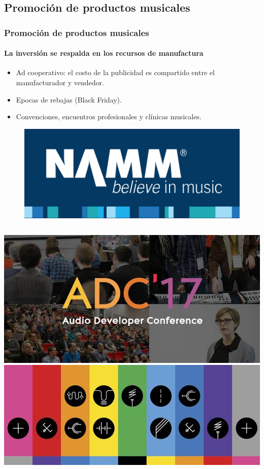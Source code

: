 \documentclass[xcolor=table]{beamer}
\begin{document}
	\subsection{Promoción de productos musicales}
	\begin{frame}
		\frametitle{Promoción de productos musicales}
		\framesubtitle{La inversión se respalda en los recursos de manufactura}
		\begin{itemize}
			\item Ad cooperativo: el costo de la publicidad es compartido entre el manufacturador y vendedor.
			\item Epocas de rebajas (Black Friday).
			\item Convenciones, encuentros profesionales y clínicas musicales.
		\end{itemize}
		\begin{figure}[h]
    			\includegraphics[scale=0.50]{images/namm.png}
    			\label{fig:2}
    		\end{figure}
		\begin{columns}[t]
			\centering
    			\includegraphics[scale=0.10]{images/audio-developer-conference-2017_cover2.jpg}
    			\label{fig:3}
			\centering
    			\includegraphics[scale=0.50]{images/Music_Tech_Fest.jpg}
    			\label{fig:4}
    		\end{columns}
	\end{frame}
\end{document}
